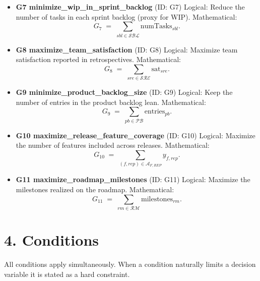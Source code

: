 \documentclass[11pt,a4paper]{article}
\begin{document}
\begin{itemize}
  \item \textbf{G7 minimize\_wip\_in\_sprint\_backlog} (ID: G7)\newline
  Logical: Reduce the number of tasks in each sprint backlog (proxy for WIP).\newline
  Mathematical:
  \[
    G_{7} \;=\; \sum_{sbl\in\mathcal{SBL}} \text{numTasks}_{sbl}.
  \]

  \item \textbf{G8 maximize\_team\_satisfaction} (ID: G8)\newline
  Logical: Maximize team satisfaction reported in retrospectives.\newline
  Mathematical:
  \[
    G_{8} \;=\; \sum_{sre\in\mathcal{SRE}} \text{sat}_{sre}.
  \]

  \item \textbf{G9 minimize\_product\_backlog\_size} (ID: G9)\newline
  Logical: Keep the number of entries in the product backlog lean.\newline
  Mathematical:
  \[
    G_{9} \;=\; \sum_{pb\in\mathcal{PB}} \text{entries}_{pb}.
  \]

  \item \textbf{G10 maximize\_release\_feature\_coverage} (ID: G10)\newline
  Logical: Maximize the number of features included across releases.\newline
  Mathematical:
  \[
    G_{10} \;=\; \sum_{(f,rep)\in \mathcal{A}_{F,REP}} y_{f,rep}.
  \]

  \item \textbf{G11 maximize\_roadmap\_milestones} (ID: G11)\newline
  Logical: Maximize the milestones realized on the roadmap.\newline
  Mathematical:
  \[
    G_{11} \;=\; \sum_{rm\in\mathcal{RM}} \text{milestones}_{rm}.
  \]
\end{itemize}

\section{4. Conditions}
All conditions apply simultaneously. When a condition naturally limits a decision variable it is stated as a hard constraint.
\end{document}
